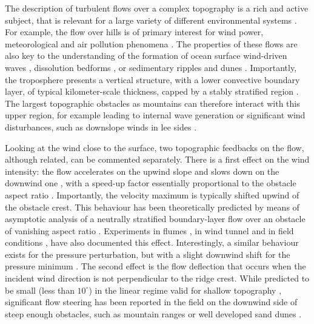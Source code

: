 The description of turbulent flows over a complex topography is a rich and active subject, that is relevant for a large variety of different environmental systems \citep{Finnigan2020}. For example, the flow over hills is of primary interest for wind power, meteorological and air pollution phenomena \citep{Taylor1987}. The properties of these flows are also key to the understanding of the formation of ocean surface wind-driven waves \citep{Sullivan2010}, dissolution bedforms \citep{Claudin2017}, or sedimentary ripples and dunes \citep{Charru2013, Courrech2015}. Importantly, the troposphere presents a vertical structure, with a lower convective boundary layer, of typical kilometer-scale thickness, capped by a stably stratified region \citep{Stull1988}. The largest topographic obstacles as mountains can therefore interact with this upper region, for example leading to internal wave generation or significant wind disturbances, such as downslope winds in lee sides \citep{Durran1990}.

Looking at the wind close to the surface, two topographic feedbacks on the flow, although related, can be commented separately. There is a first effect on the wind intensity: the flow accelerates on the upwind slope and slows down on the downwind one \citep{Baddock2011}, with a speed-up factor essentially proportional to the obstacle aspect ratio . Importantly, the velocity maximum is typically shifted upwind of the obstacle crest. This behaviour has been theoretically predicted by means of asymptotic analysis of a neutrally stratified boundary-layer flow over an obstacle of vanishing aspect ratio \citep{Jackson1975, Mason1979, Sykes1980, Hunt1988, Belcher1998}. Experiments in flumes \citep{Zilker1977, Zilker1979, Frederick1988, Poggi2007}, in wind tunnel \citep{Gong1989, Finnigan1990, Gong1996} and in field conditions \citep{Taylor1987a, Claudin2013, Fernando2019, Lu2021}, have also documented this effect. Interestingly, a similar behaviour exists for the pressure perturbation, but with a slight downwind shift for the pressure minimum \citep{Claudin2021}. The second effect is the flow deflection that occurs when the incident wind direction is not perpendicular to the ridge crest. While predicted to be small (less than $10^{\circ}$) in the linear regime valid for shallow topography \citep{Gadal2019}, significant flow steering has been reported in the field on the downwind side of steep enough obstacles, such as mountain ranges \citep{Kim2000, Lewis2008, Fernando2019} or well developed sand dunes \citep{Walker2009, Hesp2015, Walker2017, Smith2017}.

